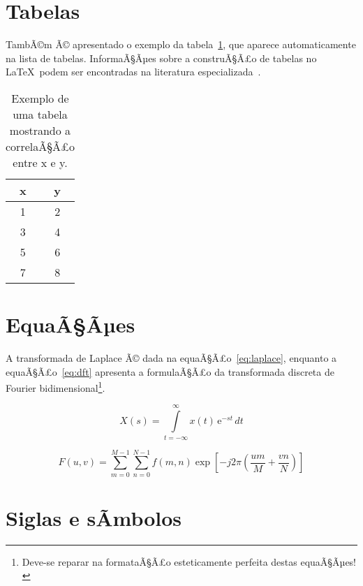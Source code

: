 \documentclass[openright]{normas-utf-tex} %
\begin{document}
\section{Tabelas}
\label{sec:tabelas}

TambÃ©m Ã© apresentado o exemplo da tabela~\ref{tab:correlacao}, que aparece automaticamente na lista de tabelas. InformaÃ§Ãµes sobre a construÃ§Ã£o de tabelas no \LaTeX\ podem ser encontradas na literatura especializada~\cite{Lamport1986,Buerger1989,Kopka2003,Mittelbach2004}.

\begin{table}[!htb]
	\centering
	\caption[Exemplo de uma tabela]{Exemplo de uma tabela mostrando a correlaÃ§Ã£o entre x e y.}
	\label{tab:correlacao}
	\begin{tabular}{cc}
		\hline
		x & y \\
		\hline
		1 & 2 \\
		3 & 4 \\
		5 & 6 \\
		7 & 8 \\
		\hline
	\end{tabular}
\end{table}



\section{EquaÃ§Ãµes}
\label{sec:equacoes}

A transformada de Laplace Ã© dada na equaÃ§Ã£o~\eqref{eq:laplace}, enquanto a equaÃ§Ã£o~\eqref{eq:dft} apresenta a formulaÃ§Ã£o da transformada discreta de Fourier bidimensional\footnote{Deve-se reparar na formataÃ§Ã£o esteticamente perfeita destas equaÃ§Ãµes!}.

\begin{equation}
X(s) = \int\limits_{t = -\infty}^{\infty} x(t) \, \text{e}^{-st} \, dt
\label{eq:laplace}
\end{equation}

\begin{equation}
F(u, v) = \sum_{m = 0}^{M - 1} \sum_{n = 0}^{N - 1} f(m, n) \exp \left[ -j 2 \pi \left( \frac{u m}{M} + \frac{v n}{N} \right) \right]
\label{eq:dft}
\end{equation}

\section{Siglas e sÃ­mbolos}
\label{sec:siglasSimbolos}
\end{document}
